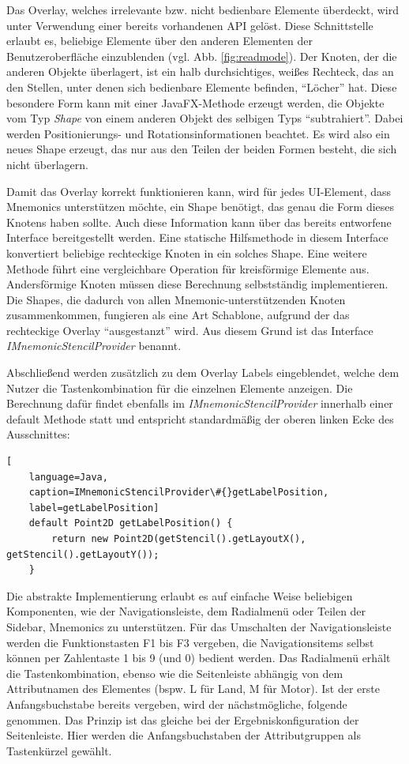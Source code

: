 Das Overlay, welches irrelevante bzw. nicht bedienbare Elemente überdeckt, wird unter Verwendung einer bereits vorhandenen API gelöst. Diese Schnittstelle erlaubt es, beliebige Elemente über den anderen Elementen der Benutzeroberfläche einzublenden (vgl. Abb. \ref{fig:readmode}). Der Knoten, der die anderen Objekte überlagert, ist ein halb durchsichtiges, weißes Rechteck, das an den Stellen, unter denen sich bedienbare Elemente befinden, \enquote{Löcher} hat. Diese besondere Form kann mit einer JavaFX-Methode erzeugt werden, die Objekte vom Typ \textit{Shape} von einem anderen Objekt des selbigen Typs \enquote{subtrahiert}. Dabei werden Positionierungs- und Rotationsinformationen beachtet. Es wird also ein neues Shape erzeugt, das nur aus den Teilen der beiden Formen besteht, die sich nicht überlagern.\par
Damit das Overlay korrekt funktionieren kann, wird für jedes UI-Element, dass Mnemonics unterstützen möchte, ein Shape benötigt, das genau die Form dieses Knotens haben sollte. Auch diese Information kann über das bereits entworfene Interface bereitgestellt werden. Eine statische Hilfsmethode in diesem Interface konvertiert beliebige rechteckige Knoten in ein solches Shape. Eine weitere Methode führt eine vergleichbare Operation für kreisförmige Elemente aus. Andersförmige Knoten müssen diese Berechnung selbstständig implementieren. Die Shapes, die dadurch von allen Mnemonic-unterstützenden Knoten zusammenkommen, fungieren als eine Art Schablone, aufgrund der das rechteckige Overlay \enquote{ausgestanzt} wird. Aus diesem Grund ist das Interface \textit{IMnemonicStencilProvider} benannt.\par
Abschließend werden zusätzlich zu dem Overlay Labels eingeblendet, welche dem Nutzer die Tastenkombination für die einzelnen Elemente anzeigen. Die Berechnung dafür findet ebenfalls im \textit{IMnemonicStencilProvider} innerhalb einer default Methode statt und entspricht standardmäßig der oberen linken Ecke des Ausschnittes:\par
{}
\begin{lstlisting}[
    language=Java,
    caption=IMnemonicStencilProvider\#{}getLabelPosition,
    label=getLabelPosition]
    default Point2D getLabelPosition() {
        return new Point2D(getStencil().getLayoutX(), getStencil().getLayoutY());
    }
\end{lstlisting}
Die abstrakte Implementierung erlaubt es auf einfache Weise beliebigen Komponenten, wie der Navigationsleiste, dem Radialmenü oder Teilen der Sidebar, Mnemonics zu unterstützen. Für das Umschalten der Navigationsleiste werden die Funktionstasten F1 bis F3 vergeben, die Navigationsitems selbst können per Zahlentaste 1 bis 9 (und 0) bedient werden. Das Radialmenü erhält die Tastenkombination, ebenso wie die Seitenleiste abhängig von dem Attributnamen des Elementes (bspw. L für Land, M für Motor). Ist der erste Anfangsbuchstabe bereits vergeben, wird der nächstmögliche, folgende genommen. Das Prinzip ist das gleiche bei der Ergebniskonfiguration der Seitenleiste. Hier werden die Anfangsbuchstaben der Attributgruppen als Tastenkürzel gewählt.\par
